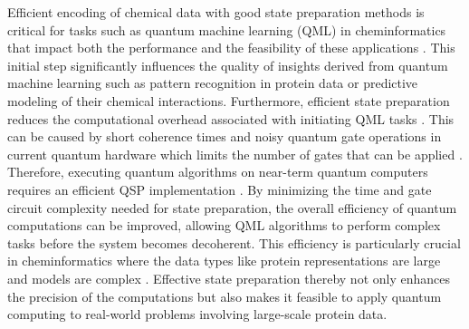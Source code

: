 Efficient encoding of chemical data with good state preparation methods is critical for tasks such as quantum machine learning (QML) in cheminformatics that impact both the performance and the feasibility of these applications \cite{bernal2022perspectives, ajagekar2022new}. This initial step significantly influences the quality of insights derived from quantum machine learning such as pattern recognition in protein data or predictive modeling of their chemical interactions. Furthermore, efficient state preparation reduces the computational overhead associated with initiating QML tasks \cite{gujju2024quantum}. This can be caused by short coherence times and noisy quantum gate operations in current quantum 
hardware which limits the number of gates that can
be applied \cite{preskill2018quantum}. Therefore, executing quantum algorithms on near-term quantum
computers requires an efficient QSP implementation \cite{aaronson2015read}. By minimizing the time and gate circuit complexity needed for state preparation, the overall efficiency of quantum computations can be improved, allowing QML algorithms to perform complex tasks before the system becomes decoherent. This efficiency is particularly crucial in cheminformatics where the data types like protein representations are large and models are complex \cite{xu2020deep}. Effective state preparation thereby not only enhances the precision of the computations but also makes it feasible to apply quantum computing to real-world problems involving large-scale protein data.

